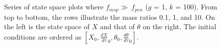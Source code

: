 \documentclass[12pt]{article}
\begin{document}
\begin{figure}
    \centering
     \\
     \\
    \caption{\small{Series of state space plots where $f_{msp} \gg \ f_{pen}$ ($g$ = 1, $k$ = 100). From top to bottom, the rows illustrate the mass ratios 0.1, 1, and 10. On the left is the state space of $X$ and that of $\theta$ on the right. The initial conditions are ordered as $[X_0, \frac{dX}{d\tau}_0, \theta_0, \frac{d\theta}{d\tau}_0]$.}}
    \label{fig:cart-mode}
\end{figure}
\end{document}
